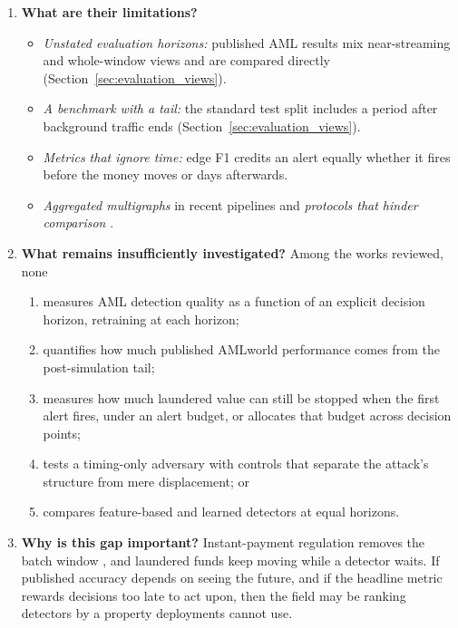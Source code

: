 \documentclass[11pt,a4paper]{article}
\begin{document}
\begin{enumerate}[leftmargin=*]
    \item \textbf{What are their limitations?}
    \begin{itemize}[leftmargin=*]
        \item \textit{Unstated evaluation horizons:} published AML results mix near-streaming and whole-window views and are compared directly (Section~\ref{sec:evaluation_views}).
        \item \textit{A benchmark with a tail:} the standard test split includes a period after background traffic ends (Section~\ref{sec:evaluation_views}).
        \item \textit{Metrics that ignore time:} edge F1 credits an alert equally whether it fires before the money moves or days afterwards.
        \item \textit{Aggregated multigraphs} in recent pipelines \cite{tian2025kar,alemari2026explainable,rico2026taml,jia2025lmae4eth} and \textit{protocols that hinder comparison} \cite{kasula2025ajk,jia2025lmae4eth,alemari2026explainable,ferretti2025aml,li2025tfgat,tian2025kar,rico2026taml}.
    \end{itemize}

    \item \textbf{What remains insufficiently investigated?}
    Among the works reviewed, none
    \begin{enumerate}[label=(\alph*)]
        \item measures AML detection quality as a function of an explicit decision horizon, retraining at each horizon;
        \item quantifies how much published AMLworld performance comes from the post-simulation tail;
        \item measures how much laundered value can still be stopped when the first alert fires, under an alert budget, or allocates that budget across decision points;
        \item tests a timing-only adversary with controls that separate the attack's structure from mere displacement; or
        \item compares feature-based and learned detectors at equal horizons.
    \end{enumerate}

    \item \textbf{Why is this gap important?}
    Instant-payment regulation removes the batch window \cite{eu2024instant}, and laundered funds keep moving while a detector waits. If published accuracy depends on seeing the future, and if the headline metric rewards decisions too late to act upon, then the field may be ranking detectors by a property deployments cannot use.


\end{enumerate}
\end{document}
